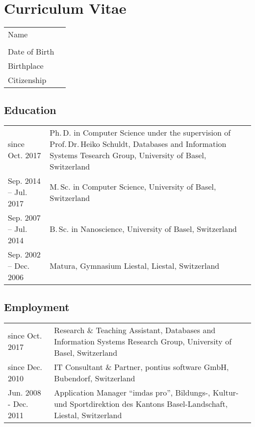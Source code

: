 
\chapter*{Curriculum Vitae}


\begin{tabularx}{\textwidth}{>{\raggedleft}p{}X}
	Name  & \thesisauthor \\
	& \thesisauthoraddress \\
	Date of Birth & \thesisauthordateofbirth \\
	Birthplace & \thesisauthorbirthplace \\
	Citizenship & \thesisauthornationalityCv \\
\end{tabularx}

\section*{Education}
\begin{tabularx}{\textwidth}{>{\raggedleft}p{}X}
	since Oct. 2017  & Ph.\,D. in Computer Science under the supervision of Prof.\,Dr.\,Heiko Schuldt, Databases and Information Systems Tesearch Group, University of Basel, Switzerland \\
	\rule{0pt}{3ex}%
	Sep. 2014 -- Jul. 2017  & M.\,Sc. in Computer Science, University of Basel, Switzerland \\
	\rule{0pt}{3ex}%
	Sep. 2007 -- Jul. 2014  & B.\,Sc. in Nanoscience, University of Basel, Switzerland \\
	\rule{0pt}{3ex}%
	Sep. 2002 -- Dec. 2006  & Matura, Gymnasium Liestal, Liestal, Switzerland \\
\end{tabularx}

\section*{Employment}
\begin{tabularx}{\textwidth}{>{\raggedleft}p{}X}
	since Oct. 2017  & Research \& Teaching Assistant, Databases and Information Systems Research Group, University of Basel, Switzerland \\
	since Dec. 2010  & IT Consultant \& Partner, pontius software GmbH, Bubendorf, Switzerland \\
	Jun. 2008 - Dec. 2011  & Application Manager ``imdas pro'', Bildungs-, Kultur- und Sportdirektion des Kantons Basel-Landschaft, Liestal, Switzerland
\end{tabularx}


